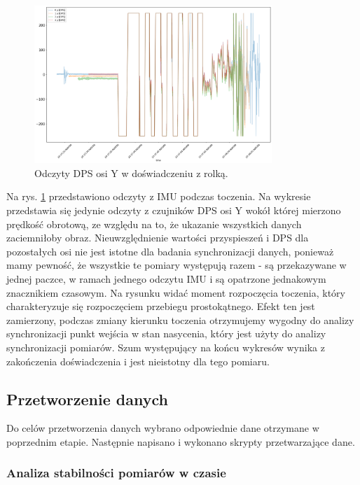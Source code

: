 \documentclass[12pt,oneside,a4paper]{book}
\theoremstyle{break}
\begin{document}
\begin{figure}[H]
    \begin{center}
        \includegraphics[width=0.8\textwidth]{kula_os_y.png}
        \caption{Odczyty DPS osi Y w doświadczeniu z rolką.}
        \label{rys:roll_Y_axis}
    \end{center}
\end{figure}

Na rys. \ref*{rys:roll_Y_axis} przedstawiono 
odczyty z IMU podczas toczenia. Na wykresie przedstawia się 
jedynie odczyty z czujników DPS osi Y wokół której 
mierzono prędkość obrotową, ze względu na to, że
ukazanie wszystkich danych zaciemniłoby obraz. Nieuwzględnienie 
wartości przyspieszeń i DPS dla pozostałych osi nie 
jest istotne dla badania
synchronizacji danych, ponieważ mamy pewność, że wszystkie te pomiary
występują razem - są przekazywane w jednej paczce, w ramach jednego
odczytu IMU i są opatrzone jednakowym znacznikiem czasowym.
Na rysunku widać moment rozpoczęcia toczenia, 
który charakteryzuje się rozpoczęciem przebiegu 
prostokątnego. Efekt ten jest zamierzony,
podczas zmiany kierunku toczenia otrzymujemy 
wygodny do analizy synchronizacji
punkt wejścia w stan nasycenia, który jest użyty 
do analizy synchronizacji pomiarów. 
Szum występujący na końcu wykresów 
wynika z zakończenia doświadczenia i jest nieistotny dla tego pomiaru.

\subsection{Przetworzenie danych}
Do celów przetworzenia danych wybrano odpowiednie dane 
otrzymane w poprzednim etapie.
Następnie napisano i wykonano skrypty przetwarzające dane.

\subsubsection{Analiza stabilności pomiarów w czasie}
\end{document}
